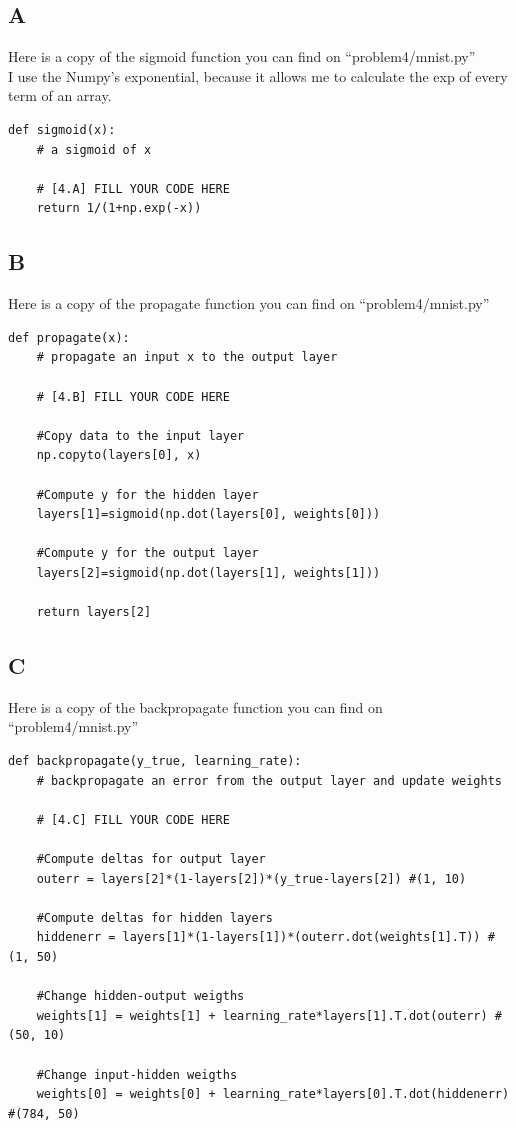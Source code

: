 \documentclass{article}
\begin{document}
        \subsection{A}
            Here is a copy of the sigmoid function you can find on ``problem4/mnist.py''\\
            I use the Numpy's exponential, because it allows me to calculate the exp of every term of an array.
            \begin{verbatim}
def sigmoid(x):
    # a sigmoid of x

    # [4.A] FILL YOUR CODE HERE
    return 1/(1+np.exp(-x))
            \end{verbatim}
        \subsection{B}
            Here is a copy of the propagate function you can find on ``problem4/mnist.py''\\
            \begin{verbatim}
def propagate(x):
    # propagate an input x to the output layer

    # [4.B] FILL YOUR CODE HERE

    #Copy data to the input layer
    np.copyto(layers[0], x)

    #Compute y for the hidden layer
    layers[1]=sigmoid(np.dot(layers[0], weights[0]))

    #Compute y for the output layer
    layers[2]=sigmoid(np.dot(layers[1], weights[1]))

    return layers[2]
            \end{verbatim}
        \subsection{C}
            Here is a copy of the backpropagate function you can find on ``problem4/mnist.py''\\
            \begin{verbatim}
def backpropagate(y_true, learning_rate):
    # backpropagate an error from the output layer and update weights

    # [4.C] FILL YOUR CODE HERE

    #Compute deltas for output layer
    outerr = layers[2]*(1-layers[2])*(y_true-layers[2]) #(1, 10)

    #Compute deltas for hidden layers
    hiddenerr = layers[1]*(1-layers[1])*(outerr.dot(weights[1].T)) #(1, 50)

    #Change hidden-output weigths
    weights[1] = weights[1] + learning_rate*layers[1].T.dot(outerr) #(50, 10)

    #Change input-hidden weigths
    weights[0] = weights[0] + learning_rate*layers[0].T.dot(hiddenerr) #(784, 50)
            \end{verbatim}
\end{document}
